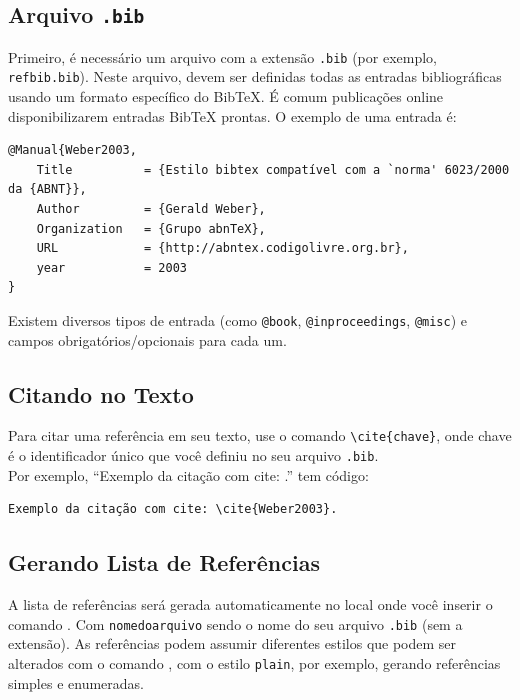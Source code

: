 \subsection{Arquivo \texttt{.bib}}

Primeiro, é necessário um arquivo com a extensão \texttt{.bib} (por exemplo, \texttt{refbib.bib}). Neste arquivo, devem ser definidas todas as entradas bibliográficas usando um formato específico do BibTeX. É comum publicações online disponibilizarem entradas BibTeX prontas. O exemplo de uma entrada é:
\begin{lstlisting}[language={[LaTeX]TeX}]
@Manual{Weber2003,
	Title          = {Estilo bibtex compatível com a `norma' 6023/2000 da {ABNT}},
	Author         = {Gerald Weber},
	Organization   = {Grupo abnTeX},
	URL            = {http://abntex.codigolivre.org.br},
	year           = 2003
}
\end{lstlisting}
Existem diversos tipos de entrada (como \texttt{@book}, \texttt{@inproceedings}, \texttt{@misc}) e campos obrigatórios/opcionais para cada um.

\subsection{Citando no Texto}
Para citar uma referência em seu texto, use o comando \verb|\cite{chave}|, onde chave é o identificador único que você definiu no seu arquivo \texttt{.bib}.\\
Por exemplo, ``Exemplo da citação com cite: \cite{Weber2003}.'' tem código:
\begin{lstlisting}[language={[LaTeX]TeX}]
Exemplo da citação com cite: \cite{Weber2003}.
\end{lstlisting}

\subsection{Gerando Lista de Referências}
A lista de referências será gerada automaticamente no local onde você inserir o comando \verb||. Com \texttt{nomedoarquivo} sendo o nome do seu arquivo \texttt{.bib} (sem a extensão). As referências podem assumir diferentes estilos que podem ser alterados com o comando \verb||, com o estilo \texttt{plain}, por exemplo, gerando referências simples e enumeradas.
